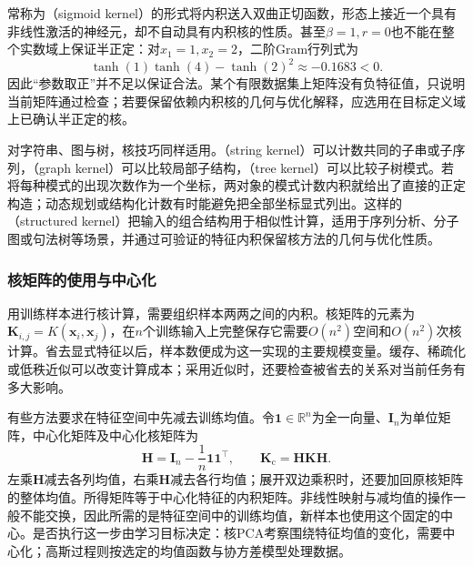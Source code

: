 常称为（sigmoid kernel）的形式将内积送入双曲正切函数，形态上接近一个具有非线性激活的神经元，却不自动具有内积核的性质。甚至$\beta=1,r=0$也不能在整个实数域上保证半正定：对$x_1=1,x_2=2$，二阶Gram行列式为
\[
  \tanh(1)\tanh(4)-\tanh(2)^2
  \approx-0.1683<0.
\]
因此“参数取正”并不足以保证合法。某个有限数据集上矩阵没有负特征值，只说明当前矩阵通过检查；若要保留依赖内积核的几何与优化解释，应选用在目标定义域上已确认半正定的核。

对字符串、图与树，核技巧同样适用。（string kernel）可以计数共同的子串或子序列，（graph kernel）可以比较局部子结构，（tree kernel）可以比较子树模式。若将每种模式的出现次数作为一个坐标，两对象的模式计数内积就给出了直接的正定构造；动态规划或结构化计数有时能避免把全部坐标显式列出。这样的（structured kernel）把输入的组合结构用于相似性计算，适用于序列分析、分子图或句法树等场景，并通过可验证的特征内积保留核方法的几何与优化性质。

\subsubsection{核矩阵的使用与中心化}
\label{sec:classic-overview-kernel-matrix}

用训练样本进行核计算，需要组织样本两两之间的内积。核矩阵的元素为$\bm{K}_{i,j}=K(\bm{x}_i,\bm{x}_j)$，在$n$个训练输入上完整保存它需要$O(n^2)$空间和$O(n^2)$次核计算。省去显式特征以后，样本数便成为这一实现的主要规模变量。缓存、稀疏化或低秩近似可以改变计算成本；采用近似时，还要检查被省去的关系对当前任务有多大影响。

有些方法要求在特征空间中先减去训练均值。令$\bm{1}\in\mathbb{R}^{n}$为全一向量、$\bm{I}_n$为单位矩阵，中心化矩阵及中心化核矩阵为
\begin{equation}
  \bm{H}=\bm{I}_n-\frac1n\bm{1}\bm{1}^{\top},
  \qquad \bm{K}_{\mathrm{c}}=\bm{H}\bm{K}\bm{H}.
  \label{eq:classic-overview-kernel-centering}
\end{equation}
左乘$\bm{H}$减去各列均值，右乘$\bm{H}$减去各行均值；展开双边乘积时，还要加回原核矩阵的整体均值。所得矩阵等于中心化特征的内积矩阵。非线性映射与减均值的操作一般不能交换，因此所需的是特征空间中的训练均值，新样本也使用这个固定的中心。是否执行这一步由学习目标决定：核PCA考察围绕特征均值的变化，需要中心化；高斯过程则按选定的均值函数与协方差模型处理数据。
